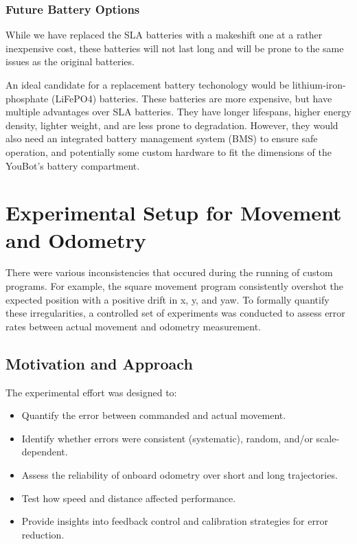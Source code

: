 \documentclass[a4paper, 12pt]{article}
\begin{document}
    \subsubsection{Future Battery Options}

    While we have replaced the SLA batteries with a makeshift one at a rather inexpensive cost, these batteries will not last long and will be prone to the same issues as the original batteries. 

    An ideal candidate for a replacement battery techonology would be lithium-iron-phosphate (LiFePO4) batteries. These batteries are more expensive, but have multiple advantages over SLA batteries. They have longer lifespans, higher energy density, lighter weight, and are less prone to degradation. However, they would also need an integrated battery management system (BMS) to ensure safe operation, and potentially some custom hardware to fit the dimensions of the YouBot's battery compartment. 

    \pagebreak
    
    \section{Experimental Setup for Movement and Odometry}

    There were various inconsistencies that occured during the running of custom programs. For example, the square movement program consistently overshot the expected position with a positive drift in x, y, and yaw. To formally quantify these irregularities, a controlled set of experiments was conducted to assess error rates between actual movement and odometry measurement.


    \subsection{Motivation and Approach}

    The experimental effort was designed to:
    \begin{itemize}[noitemsep]
        \item Quantify the error between commanded and actual movement.
        \item Identify whether errors were consistent (systematic), random, and/or scale-dependent.
        \item Assess the reliability of onboard odometry over short and long trajectories.
        \item Test how speed and distance affected performance.
        \item Provide insights into feedback control and calibration strategies for error reduction.
    \end{itemize}
\end{document}
